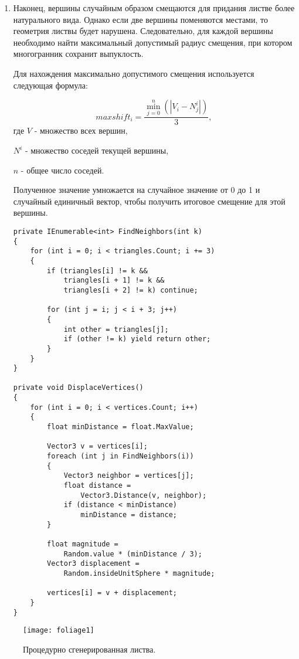 \begin{enumerate}
\item Наконец, вершины случайным образом смещаются для придания листве более натурального вида. Однако если две вершины поменяются местами, то геометрия листвы будет нарушена. Следовательно, для каждой вершины необходимо найти максимальный допустимый радиус смещения, при котором многогранник сохранит выпуклость.

Для нахождения максимально допустимого смещения используется следующая формула:

\begin{equation}
    maxshift_{i} = \frac{\displaystyle\min_{j = 0}^n(|V_{i} - N^{i}_{j}|)}{3}, 
\end{equation}
где $V$ - множество всех вершин, 

$N^{i}$ - множество соседей текущей вершины, 

$n$ - общее число соседей.

Полученное значение умножается на случайное значение от 0 до 1 и случайный единичный вектор, чтобы получить итоговое смещение для этой вершины.

\begin{lstlisting}
private IEnumerable<int> FindNeighbors(int k)
{
    for (int i = 0; i < triangles.Count; i += 3)
    {
        if (triangles[i] != k &&
            triangles[i + 1] != k &&
            triangles[i + 2] != k) continue;

        for (int j = i; j < i + 3; j++)
        {
            int other = triangles[j];
            if (other != k) yield return other;
        }
    }
}

private void DisplaceVertices()
{
    for (int i = 0; i < vertices.Count; i++)
    {
        float minDistance = float.MaxValue;

        Vector3 v = vertices[i];
        foreach (int j in FindNeighbors(i))
        {
            Vector3 neighbor = vertices[j];
            float distance = 
                Vector3.Distance(v, neighbor);
            if (distance < minDistance) 
                minDistance = distance;
        }

        float magnitude = 
            Random.value * (minDistance / 3);
        Vector3 displacement = 
            Random.insideUnitSphere * magnitude;

        vertices[i] = v + displacement;
    }
}
\end{lstlisting}
\end{enumerate}

\begin{figure}[h]
    \centering
    \texttt{[image: foliage1]}
    \caption{Процедурно сгенерированная листва.}
\end{figure}

